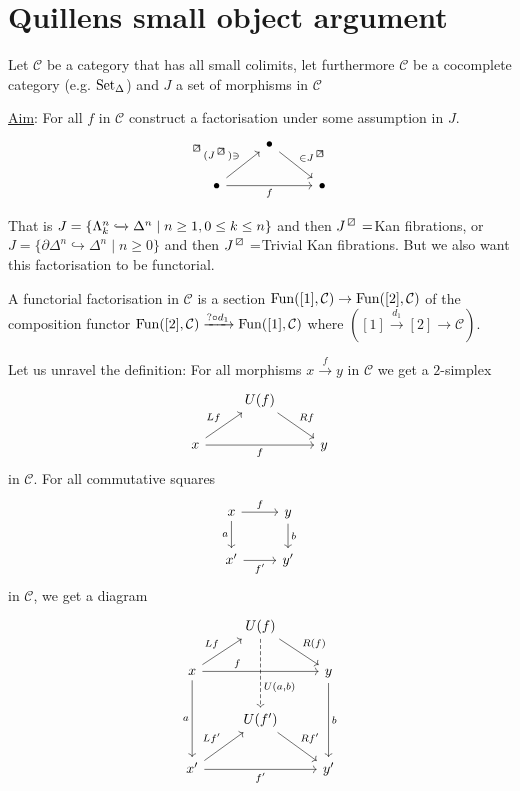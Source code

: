 \section{Quillens small object argument}

Let $\mathcal{C}$ be a category that has all small colimits, let furthermore $\mathcal{C}$ be a cocomplete category (e.g. $\operatorname{Set}_{\Delta}$)
and $J$ a set of morphisms in $\mathcal{C}$

\underline{Aim}: For all $f$ in $\mathcal{C}$ construct a factorisation under some assumption in $J$.
\[
\begin{tikzcd}
    &
    \bullet
    \ar[rd, "{\in J^{\lift{}}}"]
    &
    \\
    \bullet
    \ar[ru, " \prescript{\lift{}}{}{(J^{\lift{}})} \ni"]
    \ar[rr, "f"']
    &&
    \bullet
\end{tikzcd}
\]

That is $J= \{ \Lambda_k^n \xhookrightarrow{} \Delta^n \mid n\geq 1, 0 \leq k \leq n\}$ and then $J^{\lift{}}=$Kan fibrations, or $J=\{ \partial \Delta^n \hookrightarrow \Delta^n \mid n \geq 0 \}$ and then $J^{\lift{}}=$Trivial Kan fibrations.
But we also want this factorisation to be functorial.

\begin{defi}
    A functorial factorisation in $\mathcal{C}$ is a section
    $\operatorname{Fun}([1], \mathcal{C}) \to \operatorname{Fun}([2], \mathcal{C})$
    of the composition functor $\operatorname{Fun}([2], \mathcal{C}) \xrightarrow{? \circ d_1}\operatorname{Fun}([1], \mathcal{C})$
    where $([1] \xrightarrow{d_1} [2] \to \mathcal{C})$.
\end{defi}

Let us unravel the definition:
For all morphisms $x \xrightarrow{f}y$ in $\mathcal{C}$ we get a $2$-simplex
\[
    \begin{tikzcd}
        &
        U(f) \ar[rd,"Rf"]
        &
        \\
        x
        \ar[ru, "Lf"]
        \ar[rr, "f"']
        &&
        y
    \end{tikzcd}
\]
in $\mathcal{C}$.
For all commutative squares 
\[
\begin{tikzcd}
    x
    \ar[r, "f"]
    \ar[d, "a"']
    &
    y
    \ar[d, "b"]
    \\
    x'
    \ar[r, "f'"']
    &
    y'
\end{tikzcd}
\]
in $\mathcal{C}$, we get a diagram
\[
\begin{tikzcd}
    &
    U(f)
    \ar[dd, dashed, "{U(a,b)}" pos=0.7]
    \ar[dr,"R(f)"]
    \\
    x
    \ar[dd,"a"']
    \ar[rr,"f" pos=0.3]
    \ar[ru,"Lf"]
    &&
    y
    \ar[dd,"b"]
    \\
    &
    U(f')
    \ar[rd,"Rf'"]
    \\
    x'
    \ar[ru,"Lf'"]
    \ar[rr,"f'"']
    &&
    y'
\end{tikzcd}
\]

